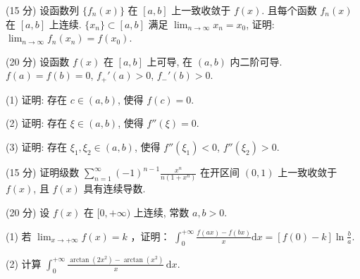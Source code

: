 (15 分) 设函数列 $\{f_n(x)\}$ 在 $[a, b]$ 上一致收敛于 $f(x)$. 且每个函数 $f_n(x)$ 在 $[a, b]$ 上连续. $\{x_n\} \subset [a, b]$ 满足 $\lim_{n \to \infty} x_n = x_0$, 证明: $\lim_{n \to \infty} f_n(x_n) = f(x_0)$.\par
(20 分) 设函数 $f(x)$ 在 $[a, b]$ 上可导, 在 $(a, b)$ 内二阶可导. $f(a) = f(b) = 0$, $f_{+}'(a) > 0$, $f_{-}'(b) > 0$.\par
(1) 证明: 存在 $c \in (a, b)$, 使得 $f(c) = 0$.\par
(2) 证明: 存在 $\xi \in (a, b)$, 使得 $f''(\xi) = 0$.\par
(3) 证明: 存在 $\xi_1, \xi_2 \in (a, b)$, 使得 $f''(\xi_1) < 0$, $f''(\xi_2) > 0$.\par
(15 分) 证明级数 $\sum_{n=1}^{\infty} (-1)^{n-1} \frac{x^n}{n(1 + x^n)}$ 在开区间 $(0,1)$ 上一致收敛于 $f(x)$, 且 $f(x)$ 具有连续导数.\par
(20 分) 设 $f(x)$ 在 $[0, +\infty)$ 上连续, 常数 $a, b > 0$.\par
(1) 若 $\lim_{x\to +\infty}f(x) = k$ ，证明： $\int_0^{+\infty}\frac{f(ax) - f(bx)}{x}\mathrm{d}x = [f(0) - k]\ln \frac{b}{a}.$\par
(2) 计算 $\int_0^{+\infty} \frac{\arctan(2x^2) - \arctan(x^2)}{x} \, \mathrm{d}x$.\par
